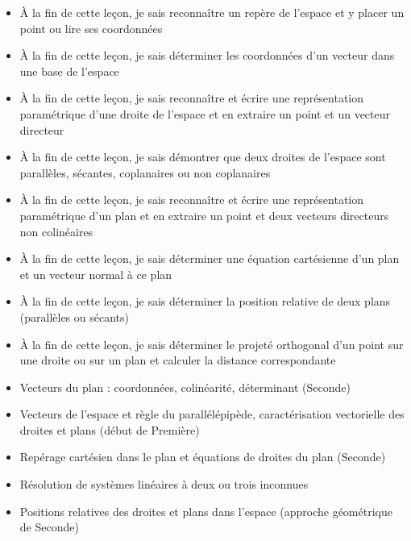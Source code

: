 \documentclass[11pt]{article}
\begin{document}
\begin{objectifs}
\begin{itemize}
\item À la fin de cette leçon, je sais reconnaître un repère de l'espace et y placer un point ou lire ses coordonnées
\item À la fin de cette leçon, je sais déterminer les coordonnées d'un vecteur dans une base de l'espace
\item À la fin de cette leçon, je sais reconnaître et écrire une représentation paramétrique d'une droite de l'espace et en extraire un point et un vecteur directeur
\item À la fin de cette leçon, je sais démontrer que deux droites de l'espace sont parallèles, sécantes, coplanaires ou non coplanaires
\item À la fin de cette leçon, je sais reconnaître et écrire une représentation paramétrique d'un plan et en extraire un point et deux vecteurs directeurs non colinéaires
\item À la fin de cette leçon, je sais déterminer une équation cartésienne d'un plan et un vecteur normal à ce plan
\item À la fin de cette leçon, je sais déterminer la position relative de deux plans (parallèles ou sécants)
\item À la fin de cette leçon, je sais déterminer le projeté orthogonal d'un point sur une droite ou sur un plan et calculer la distance correspondante
\end{itemize}
\end{objectifs}

\begin{prerequis}
\begin{itemize}
\item Vecteurs du plan : coordonnées, colinéarité, déterminant (Seconde)
\item Vecteurs de l'espace et règle du parallélépipède, caractérisation vectorielle des droites et plans (début de Première)
\item Repérage cartésien dans le plan et équations de droites du plan (Seconde)
\item Résolution de systèmes linéaires à deux ou trois inconnues
\item Positions relatives des droites et plans dans l'espace (approche géométrique de Seconde)
\end{itemize}
\end{prerequis}

\newpage
\end{document}
